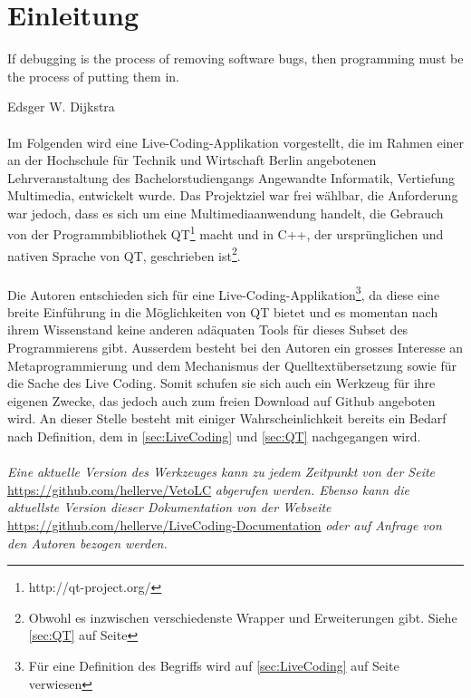 \tableofcontents
\newpage
\section{Einleitung}
\epigraph{If debugging is the process of removing software bugs, then programming must be the process of putting them in.}{Edsger W. Dijkstra}
\paragraph{}
    Im Folgenden wird eine Live-Coding-Applikation vorgestellt, die im Rahmen einer an der Hochschule für Technik und Wirtschaft
	Berlin angebotenen Lehrveranstaltung des Bachelorstudiengangs Angewandte Informatik, Vertiefung Multimedia, entwickelt wurde.
	Das Projektziel war frei wählbar, die Anforderung war jedoch, dass es sich um eine Multimediaanwendung handelt, die Gebrauch von
	der Programmbibliothek QT\footnote{http://qt-project.org/} macht und in C++, der ursprünglichen und nativen Sprache von QT, 
	geschrieben ist\footnote{Obwohl es inzwischen verschiedenste Wrapper und Erweiterungen gibt. Siehe \ref{sec:QT} auf 
	Seite \pageref{sec:QT}}.
\paragraph{}
	Die Autoren entschieden sich für eine Live-Coding-Applikation\footnote{Für eine Definition des Begriffs wird auf \ref{sec:LiveCoding}
	auf Seite \pageref{sec:LiveCoding} verwiesen}, da diese eine breite Einführung in die Möglichkeiten von QT bietet und es momentan
	nach ihrem Wissenstand keine anderen adäquaten Tools für dieses Subset des Programmierens gibt. Ausserdem besteht bei den Autoren
	ein grosses Interesse an Metaprogrammierung und dem Mechanismus der Quelltextübersetzung sowie für die Sache des Live Coding.
	Somit schufen sie sich auch ein Werkzeug für ihre eigenen Zwecke, das jedoch auch zum freien Download auf Github
	angeboten wird. An dieser Stelle besteht mit einiger Wahrscheinlichkeit bereits ein Bedarf nach Definition, dem in \ref{sec:LiveCoding}
	und \ref{sec:QT} nachgegangen wird.
\paragraph{}
    \textit{Eine aktuelle Version des Werkzeuges kann zu jedem Zeitpunkt von der Seite }\url{https://github.com/hellerve/VetoLC}\textit{ abgerufen werden.
    Ebenso kann die aktuellste Version dieser Dokumentation von der Webseite}\linebreak
    \url{https://github.com/hellerve/LiveCoding-Documentation}\textit{ oder auf Anfrage von den Autoren bezogen werden.}
\newpage
